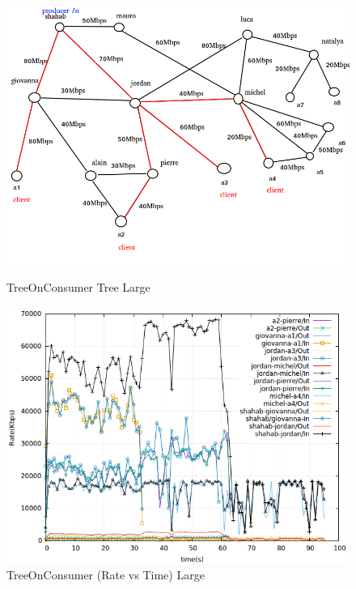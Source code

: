 \begin{figure}[H]

\begin{center}

\includegraphics[scale = 0.4]{Figures/TreeOnConsumer_big.png}

\caption{TreeOnConsumer Tree Large} \label{TreeOnConsumer_big} 


\includegraphics[scale = 0.4]{Figures/treeonconsumer_big.png}

\caption{TreeOnConsumer (Rate vs Time) Large} \label{treeonconsumer_big} 


\end{center}

\end{figure}


